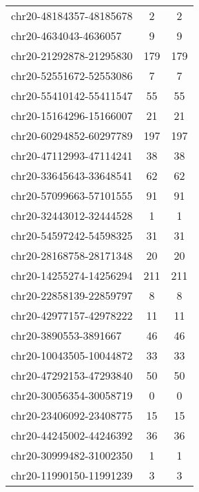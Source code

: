 \begin{longtable}{lSS}
	chr20-48184357-48185678 & 2    & 2                               \\
	chr20-4634043-4636057   & 9    & 9                               \\
	chr20-21292878-21295830 & 179  & 179                             \\
	chr20-52551672-52553086 & 7    & 7                               \\
	chr20-55410142-55411547 & 55   & 55                              \\
	chr20-15164296-15166007 & 21   & 21                              \\
	chr20-60294852-60297789 & 197  & 197                             \\
	chr20-47112993-47114241 & 38   & 38                              \\
	chr20-33645643-33648541 & 62   & 62                              \\
	chr20-57099663-57101555 & 91   & 91                              \\
	chr20-32443012-32444528 & 1    & 1                               \\
	chr20-54597242-54598325 & 31   & 31                              \\
	chr20-28168758-28171348 & 20   & 20                              \\
	chr20-14255274-14256294 & 211  & 211                             \\
	chr20-22858139-22859797 & 8    & 8                               \\
	chr20-42977157-42978222 & 11   & 11                              \\
	chr20-3890553-3891667   & 46   & 46                              \\
	chr20-10043505-10044872 & 33   & 33                              \\
	chr20-47292153-47293840 & 50   & 50                              \\
	chr20-30056354-30058719 & 0    & 0                               \\
	chr20-23406092-23408775 & 15   & 15                              \\
	chr20-44245002-44246392 & 36   & 36                              \\
	chr20-30999482-31002350 & 1    & 1                               \\
	chr20-11990150-11991239 & 3    & 3                               \\

\end{longtable}
